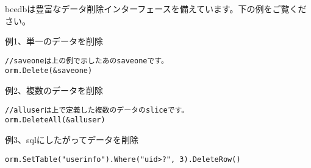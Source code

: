 beedbは豊富なデータ削除インターフェースを備えています。下の例をご覧ください。

例1、単一のデータを削除

\begin{lstlisting}[numbers=none]
//saveoneは上の例で示したあのsaveoneです。
orm.Delete(&saveone)
\end{lstlisting}

例2、複数のデータを削除

\begin{lstlisting}[numbers=none]
//alluserは上で定義した複数のデータのsliceです。
orm.DeleteAll(&alluser)
\end{lstlisting}

例3、sqlにしたがってデータを削除

\begin{lstlisting}[numbers=none]
orm.SetTable("userinfo").Where("uid>?", 3).DeleteRow()
\end{lstlisting}


